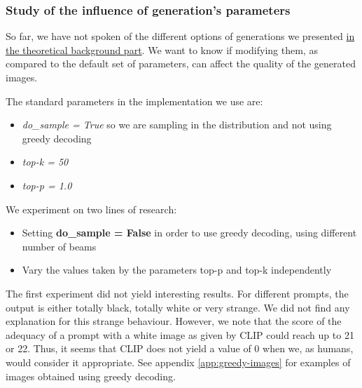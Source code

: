 \documentclass{article}
\begin{document}
\begin{multicols}{2}
\subsubsection{Study of the influence of generation's parameters}

So far, we have not spoken of the different options of generations we presented \hyperlink{options-generation}{in the theoretical background part}. We want to know if modifying them, as compared to the default set of parameters, can affect the quality of the generated images.

The standard parameters in the implementation we use are:
\begin{itemize}
    \item \textit{do\_sample = True} so we are sampling in the distribution and not using greedy decoding
    \item \textit{top-k = 50}
    \item \textit{top-p = 1.0}
\end{itemize}

We experiment on two lines of research:
\begin{itemize}
    \item Setting \textbf{do\_sample = False} in order to use greedy decoding, using different number of beams
    \item Vary the values taken by the parameters top-p and top-k independently
\end{itemize}

The first experiment did not yield interesting results. For different prompts, the output is either totally black, totally white or very strange. We did not find any explanation for this strange behaviour. However, we note that the score of the adequacy of a prompt with a white image as given by CLIP could reach up to 21 or 22. Thus, it seems that CLIP does not yield a value of 0 when we, as humans, would consider it appropriate. See appendix \ref{app:greedy-images} for examples of images obtained using greedy decoding. 


\end{multicols}
\end{document}
